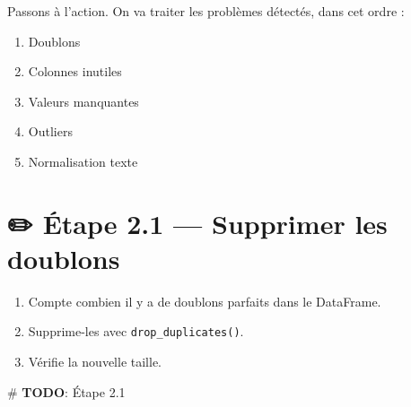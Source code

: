 \documentclass[
  french,
  11pt,
  a4paper,
]{scrbook}
\newenvironment{Shaded}{}{}
\newcommand{\AlertTok}[1]{\textcolor[rgb]{1.00,0.33,0.33}{\textbf{#1}}}
\newcommand{\CommentTok}[1]{\textcolor[rgb]{0.42,0.45,0.49}{#1}}
\providecommand{\tightlist}{%
  \setlength{\itemsep}{0pt}\setlength{\parskip}{0pt}}
\begin{document}
Passons à l'action. On va traiter les problèmes détectés, dans cet ordre
:

\begin{enumerate}
\def\labelenumi{\arabic{enumi}.}
\tightlist
\item
  Doublons
\item
  Colonnes inutiles
\item
  Valeurs manquantes
\item
  Outliers
\item
  Normalisation texte
\end{enumerate}

\section{✏️ Étape 2.1 --- Supprimer les
doublons}\label{uxe9tape-2.1-supprimer-les-doublons}

\begin{tcolorbox}[enhanced jigsaw, arc=.35mm, bottomrule=.15mm, bottomtitle=1mm, breakable, colback=white, colbacktitle=quarto-callout-note-color!10!white, colframe=quarto-callout-note-color-frame, coltitle=black, left=2mm, leftrule=.75mm, opacityback=0, opacitybacktitle=0.6, rightrule=.15mm, title={📝 À faire}, titlerule=0mm, toprule=.15mm, toptitle=1mm]

\begin{enumerate}
\def\labelenumi{\arabic{enumi}.}
\tightlist
\item
  Compte combien il y a de doublons parfaits dans le DataFrame.
\item
  Supprime-les avec \texttt{drop\_duplicates()}.
\item
  Vérifie la nouvelle taille.
\end{enumerate}

\end{tcolorbox}

\begin{Shaded}
\begin{Highlighting}[]
\CommentTok{\# }\AlertTok{TODO}\CommentTok{: Étape 2.1}
\end{Highlighting}
\end{Shaded}
\end{document}
